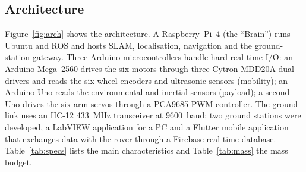 \documentclass[conference]{IEEEtran}
\begin{document}
\subsection{Architecture}
Figure~\ref{fig:arch} shows the architecture. A Raspberry~Pi~4 (the ``Brain'') runs Ubuntu and ROS and hosts SLAM, localisation, navigation and the ground-station gateway. Three Arduino microcontrollers handle hard real-time I/O: an Arduino Mega~2560 drives the six motors through three Cytron MDD20A dual drivers and reads the six wheel encoders and ultrasonic sensors (mobility); an Arduino Uno reads the environmental and inertial sensors (payload); a second Uno drives the six arm servos through a PCA9685 PWM controller. The ground link uses an HC-12 \SI{433}{\mega\hertz} transceiver at \SI{9600}{baud}; two ground stations were developed, a LabVIEW application for a PC and a Flutter mobile application that exchanges data with the rover through a Firebase real-time database. Table~\ref{tab:specs} lists the main characteristics and Table~\ref{tab:mass} the mass budget.
\end{document}
